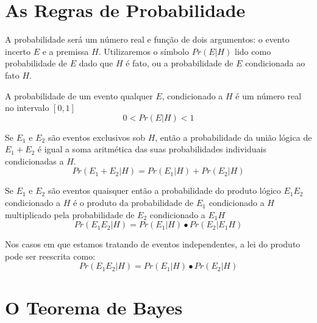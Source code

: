 \documentclass[lnbip]{svmultln}
\begin{document}
\section{As Regras de Probabilidade}

A probabilidade será um número real e função de dois argumentos: o evento incerto $E$ e a premissa $H$. Utilizaremos o símbolo $Pr(E|H)$ lido como probabilidade de $E$ dado que $H$ é fato, ou a probabilidade de $E$ condicionada ao fato $H$.

\begin{tcolorbox}[colback=blue!5,colframe=blue!75!black,title=A Lei da convexidade]
    A probabilidade de um evento qualquer $E$, condicionado a $H$ é um número real no intervalo $[0,1]$
    \begin{equation}
        0<Pr(E|H)<1
    \end{equation}
\end{tcolorbox}

\begin{tcolorbox}[colback=blue!5,colframe=blue!75!black,title=A Lei da adição]
    Se $E_1$ e $E_2$ são eventos exclusivos sob $H$, então a probabilidade da união lógica de $E_1 + E_2$ é igual a soma aritmética das suas probabilidades individuais condicionadas a $H$.
    \begin{equation}
        Pr(E_1 + E_2 | H) = Pr(E_1|H) + Pr(E_2|H)
    \end{equation}
\end{tcolorbox}

\begin{tcolorbox}[colback=blue!5,colframe=blue!75!black,title=A Lei do produto]
    Se $E_1$ e $E_2$ são eventos quaisquer então a probabilidade do produto lógico $E_1 E_2$ condicionado a $H$ é o produto da probabilidade de $E_1$ condicionado a $H$ multiplicado pela probabilidade de $E_2$ condicionado a $E_1 H$
    \begin{equation}
        Pr(E_1 E_2 | H) = Pr(E_1|H) \bullet Pr(E_2|E_1 H)
    \end{equation}
\end{tcolorbox}

Nos casos em que estamos tratando de eventos independentes, a lei do produto pode ser reescrita como:
\begin{equation}
    Pr(E_1 E_2 | H) = Pr(E_1|H) \bullet Pr(E_2|H)
\end{equation}

\section{O Teorema de Bayes}
\end{document}
